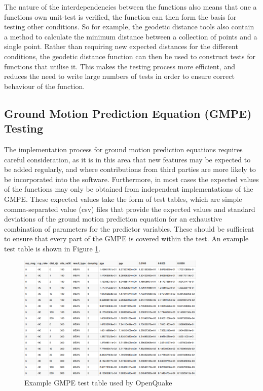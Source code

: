 The nature of the interdependencies between the functions also means that one a
functions own unit-test is verified, the function can then form the basis for
testing other conditions. So for example, the geodetic distance tools also
contain a method to calculate the minimum distance between a collection of
points and a single point. Rather than requiring new expected distances for the
different conditions, the geodetic distance function can then be used to
construct tests for functions that utilise it. This makes the testing process
more efficient, and reduces the need to write large numbers of tests in order to
ensure correct behaviour of the function.
%
\subsection{Ground Motion Prediction Equation (GMPE) Testing}
The implementation process for ground motion prediction equations requires
careful consideration, as it is in this area that new features may be expected
to be added regularly, and where contributions from third parties are more
likely to be incorporated into the software. Furthermore, in most cases the
expected values of the functions may only be obtained from independent
implementations of the GMPE. These expected values take the form of test tables,
which are simple comma-separated value (csv) files that provide the expected
values and standard deviations of the ground motion prediction equation for an
exhaustive combination of parameters for the predictor variables. These should
be sufficient to ensure that every part of the GMPE is covered within the test.
An example test table is shown in Figure \ref{fig:gmpe_test_table}.
%
\begin{figure}[htbp]
  \centering
  \includegraphics[width=0.8\textwidth]{./qareport/pictures/test_tables_screen_capture.pdf}
  \caption{Example GMPE test table used by OpenQuake}
  \label{fig:gmpe_test_table}
\end{figure}

